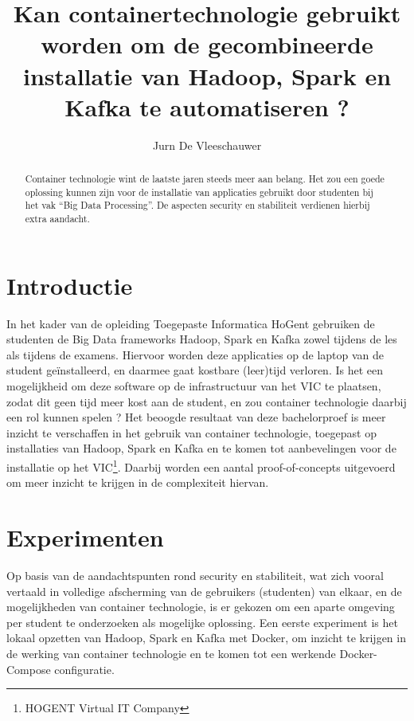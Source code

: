 \documentclass[a0,portrait]{hogent-poster}
\title{Kan containertechnologie gebruikt worden om de gecombineerde installatie van Hadoop, Spark en Kafka te automatiseren ?}
\author{Jurn De Vleeschauwer}
\begin{document}
\maketitle

\begin{abstract}
Container technologie wint de laatste jaren steeds meer aan belang. Het zou een goede oplossing kunnen zijn voor de installatie van applicaties gebruikt door studenten bij het vak “Big Data Processing”. De aspecten security en stabiliteit verdienen hierbij extra aandacht.
\end{abstract}

\begin{multicols}{2} %

\section{Introductie}
In het kader van de opleiding Toegepaste Informatica HoGent gebruiken de studenten de Big Data frameworks Hadoop, Spark en Kafka zowel tijdens de les als tijdens de examens. Hiervoor worden deze applicaties op de laptop van de student geïnstalleerd, en daarmee gaat kostbare (leer)tijd verloren. Is het een mogelijkheid om deze software op de infrastructuur van het VIC te plaatsen, zodat dit geen tijd meer kost aan de student, en zou container technologie daarbij een rol kunnen spelen ?
\newline
\newline
Het beoogde resultaat van deze bachelorproef is meer inzicht te verschaffen in het gebruik van container technologie, toegepast op  installaties van Hadoop, Spark en Kafka en te komen tot aanbevelingen voor de installatie op het VIC\footnote{HOGENT Virtual IT Company}. Daarbij worden een aantal proof-of-concepts uitgevoerd om meer inzicht te krijgen in de complexiteit hiervan.

\section{Experimenten}
Op basis van de aandachtspunten rond security en stabiliteit, wat zich vooral vertaald in volledige afscherming van de gebruikers (studenten) van elkaar, en de mogelijkheden van container technologie, is er gekozen om een aparte omgeving per student te onderzoeken als mogelijke oplossing.
\newline
\newline
Een eerste experiment is het lokaal opzetten van Hadoop, Spark en Kafka met Docker, om inzicht te krijgen in de werking van container technologie en te komen tot een werkende Docker-Compose configuratie.
\newline
\newline



\end{multicols}
\end{document}
